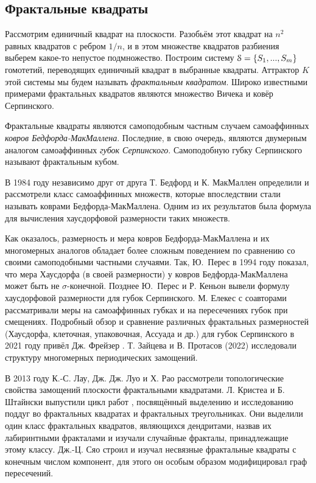 \subsection{Фрактальные квадраты}\label{ssec:HFS}

Рассмотрим единичный квадрат на плоскости.
Разобьём этот квадрат на $n^2$ равных квадратов с ребром $1/n$, и в этом множестве квадратов разбиения выберем какое-то непустое подмножество.
Построим систему ${\EuScript S}=\{S_1,...,S_m\}$ гомотетий, переводящих единичный квадрат в выбранные квадраты. Аттрактор $K$ этой системы мы будем называть {\em фрактальным квадратом}.
Широко известными примерами фрактальных квадратов являются множество Вичека и ковёр Серпинского.

Фрактальные квадраты являются самоподобным частным случаем самоаффинных {\em ковров Бедфорда-МакМаллена}.
Последние, в свою очередь, являются двумерным аналогом самоаффинных {\em губок Серпинского}.
Самоподобную губку Серпинского называют фрактальным кубом.

В 1984 году независимо друг от друга Т. Бедфорд \cite{Bedford1984} и К. МакМаллен \cite{McMullen1984} определили и рассмотрели класс самоаффинных множеств, которые впоследствии стали называть коврами Бедфорда-МакМаллена.
Одним из их результатов была формула для вычисления хаусдорфовой размерности таких множеств.

Как оказалось, размерность и мера ковров Бедфорда-\linebreak МакМаллена и их многомерных аналогов обладает более сложным поведением по сравнению со своими самоподобными частными случаями.
Так, Ю.~Перес \cite{Peres1994} в 1994 году показал, что мера Хаусдорфа (в своей размерности) у ковров Бедфорда-МакМал\-ле\-на может быть не $\sigma$-конечной.
Позднее Ю.~Перес и Р. Кеньон \cite{KenyonPeres1996} вывели формулу хаусдорфовой размерности для губок Серпинского.
М. Елекес с соавторами \cite{EKM2009} рассматривали меры на самоаффинных губках и на пересечениях губок при смещениях.
Подробный обзор и сравнение различных фрактальных размерностей (Хаусдорфа, клеточная, упаковочная, Ассуада и др.) для губок Серпинского в 2021 году привёл Дж. Фрейзер \cite{Fraser_2021}.
Т. Зайцева и В. Протасов (2022) исследовали структуру многомерных периодических замощений.

В 2013 году К.-С. Лау, Дж. Дж. Луо и Х. Рао \cite{LLR2013} рассмотрели топологические свойства замощений плоскости фрактальными квадратами.
Л. Кристеа и Б. Штайнски выпустили цикл работ \cite{CS1,CS2,CS3}, посвящённый выделению и исследованию поддуг во фрактальных квадратах и фрактальных треугольниках.
Они выделили один класс фрактальных квадратов, являющихся дендритами, назвав их лабиринтными фракталами и изучали случайные фракталы, принадлежащие этому классу.
Дж.-Ц. Сяо \cite{Xiao2021} строил и изучал несвязные фрактальные квадраты с конечным числом компонент, для этого он особым образом модифицировал граф пересечений.


